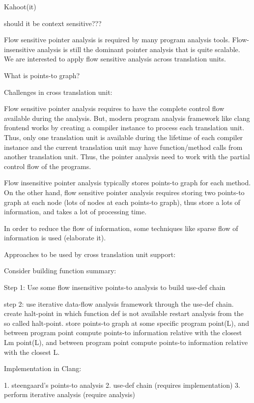 Kahoot(it)

should it be context sensitive???


Flow sensitive pointer analysis is required by many program analysis tools. Flow-insensitive analysis is still the dominant pointer analysis that is quite scalable. We are interested to apply flow sensitive analysis across translation units. 


What is points-to graph?


Challenges in cross translation unit:

Flow sensitive pointer analysis requires to have the complete control flow available during the analysis. But, modern program analysis framework like clang frontend works by creating a compiler instance to process each translation unit. Thus, only one translation unit is available during the lifetime of each compiler instance and the current translation unit may have function/method calls from another translation unit. Thus, the pointer analysis need to work with the partial control flow of the programs.

Flow insensitive pointer analysis typically stores points-to graph for each method. On the other hand, flow sensitive pointer analysis requires storing two points-to graph at each node (lots of nodes at each points-to graph), thus store a lots of information, and takes a lot of processing time.  

In order to reduce the flow of information, some techniques like sparse flow of information is used (elaborate it).

  


Approaches to be used by cross translation unit support:


Consider building function summary:


Step 1: Use some flow insensitive points-to analysis to build use-def chain

step 2: use iterative data-flow analysis framework through the use-def chain.
        create halt-point in which function def is not available
        restart analysis from the so called halt-point.
        store points-to graph at some specific program point(L), and between program point compute points-to information relative with the closest Lm point(L), and between program point compute points-to information relative with the closest L.



Implementation in Clang:

           1. steengaard's points-to analysis 
           2. use-def chain (requires implementation)
           3. perform iterative analysis (require analysis) 
